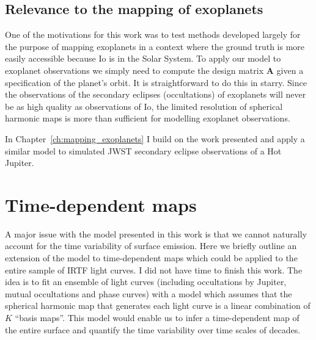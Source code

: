\documentclass[12pt,dvipsnames]{report}
\begin{document}
\subsection{Relevance to the mapping of exoplanets} 
\label{ssec:discussion_exoplanets}
One of the motivations for this work was to test methods developed largely 
for the purpose of mapping exoplanets in a context where the ground truth is more easily 
accessible because Io is in the Solar System.
To apply our model to exoplanet observations we simply need to compute the design 
matrix $\mathbf{A}$ given a specification of the planet's orbit.
It is straightforward to do this in \textsf{starry}.
Since the observations of the secondary eclipses (occultations) of exoplanets will 
never be as high quality as observations of Io, the limited resolution of spherical 
harmonic maps is more than sufficient for modelling exoplanet observations.

In Chapter~\ref{ch:mapping_exoplanets} I build on the work presented and apply 
a similar model to simulated JWST secondary eclipse observations of a Hot Jupiter.


\section{Time-dependent maps}
\label{sec:io_nmf}
A major issue with the model presented in this work is that we cannot naturally account 
for the time variability of surface emission. Here we briefly outline an extension 
of the model to time-dependent maps which could be applied to the entire sample of 
IRTF light curves. I did not have time to finish this work.
The idea is to fit an ensemble of light curves (including occultations by Jupiter, 
mutual occultations and phase curves) with a model which assumes that the spherical 
harmonic map that generates each light curve is a linear combination of 
$K$ ``basis maps''.
This model would enable us to infer a time-dependent map of the entire surface and 
quantify the time variability over time scales of decades. 
\end{document}
